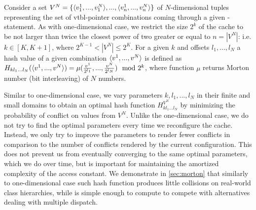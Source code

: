 Consider a set $V^N = \{\langle v_1^1,...,v_1^N\rangle,...,\langle v_n^1,...,v_n^N\rangle\}$ of 
$N$-dimensional tuples representing the set of vtbl-pointer combinations coming 
through a given -statement. As with one-dimensional case, we 
restrict the size $2^k$ of the cache to be not larger than twice the closest 
power of two greater or equal to $n=|V^N|$: i.e. $k \in [K,K+1]$, where 
$2^{K-1} < |V^N| \leq 2^K$. For a given $k$ and offsets $l_1,...,l_N$ a hash 
value of a given combination $\langle v^1,...,v^N\rangle$ is defined as 
$H_{kl_1...l_N}(\langle v^1,...,v^N\rangle)=\mu(\frac{v^1}{2^{l_1}},...,\frac{v^N}{2^{l_N}}) \mod 2^k$, 
where function $\mu$ returns Morton number (bit interleaving) of $N$ numbers.
 
Similar to one-dimensional case, we vary parameters $k,l_1,...,l_N$ in 
their finite and small domains to obtain an optimal hash function 
$H^{V^N}_{kl_1...l_N}$ by minimizing the probability of conflict on values from 
$V^N$. Unlike the one-dimensional case, we do not try to find the optimal 
parameters every time we reconfigure the cache. Instead, we only try to improve 
the parameters to render fewer conflicts in comparison to the number of conflicts 
rendered by the current configuration. This does not prevent us from eventually 
converging to the same optimal parameters, which we do over time, but is 
important for maintaining the amortized complexity of the access constant. 
We demonstrate in \textsection\ref{sec:morton} that similarly to one-dimensional 
case such hash function produces little collisions on real-world class 
hierarchies, while is simple enough to compute to compete with alternatives 
dealing with multiple dispatch.


